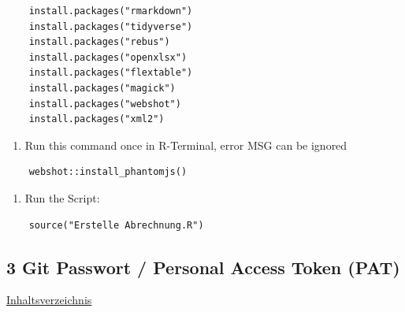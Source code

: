 \documentclass[
]{article}
\providecommand{\tightlist}{%
  \setlength{\itemsep}{0pt}\setlength{\parskip}{0pt}}
\begin{document}
\begin{verbatim}
    install.packages("rmarkdown")
    install.packages("tidyverse")
    install.packages("rebus")
    install.packages("openxlsx")
    install.packages("flextable")
    install.packages("magick")
    install.packages("webshot")
    install.packages("xml2")
\end{verbatim}

\begin{enumerate}
\def\labelenumi{\arabic{enumi}.}
\setcounter{enumi}{6}
\tightlist
\item
  Run this command once in R-Terminal, error MSG can be ignored
\end{enumerate}

\begin{verbatim}
    webshot::install_phantomjs()
\end{verbatim}

\begin{enumerate}
\def\labelenumi{\arabic{enumi}.}
\setcounter{enumi}{7}
\tightlist
\item
  Run the Script:
\end{enumerate}

\begin{verbatim}
    source("Erstelle Abrechnung.R")
\end{verbatim}

\newpage

\subsection{3 Git Passwort / Personal Access Token
(PAT)}\label{git-passwort-personal-access-token-pat}

\hyperref[Inhaltsverzeichnis]{Inhaltsverzeichnis}
\end{document}
